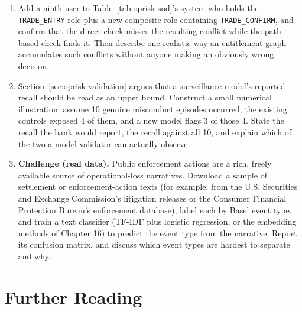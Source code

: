 \documentclass[../ai_in_finance]{subfiles}
\begin{document}
\begin{enumerate}
\item Add a ninth user to Table~\ref{tab:oprisk-sod}'s system who holds the \texttt{TRADE\_ENTRY} role plus a new composite role containing \texttt{TRADE\_CONFIRM}, and confirm that the direct check misses the resulting conflict while the path-based check finds it. Then describe one realistic way an entitlement graph accumulates such conflicts without anyone making an obviously wrong decision.
\item Section~\ref{sec:oprisk-validation} argues that a surveillance model's reported recall should be read as an upper bound. Construct a small numerical illustration: assume 10 genuine misconduct episodes occurred, the existing controls exposed 4 of them, and a new model flags 3 of those 4. State the recall the bank would report, the recall against all 10, and explain which of the two a model validator can actually observe.
\item \textbf{Challenge (real data).} Public enforcement actions are a rich, freely available source of operational-loss narratives. Download a sample of settlement or enforcement-action texts (for example, from the U.S. Securities and Exchange Commission's litigation releases or the Consumer Financial Protection Bureau's enforcement database), label each by Basel event type, and train a text classifier (TF-IDF plus logistic regression, or the embedding methods of Chapter 16) to predict the event type from the narrative. Report its confusion matrix, and discuss which event types are hardest to separate and why.
\end{enumerate}

\section{Further Reading}
\end{document}
